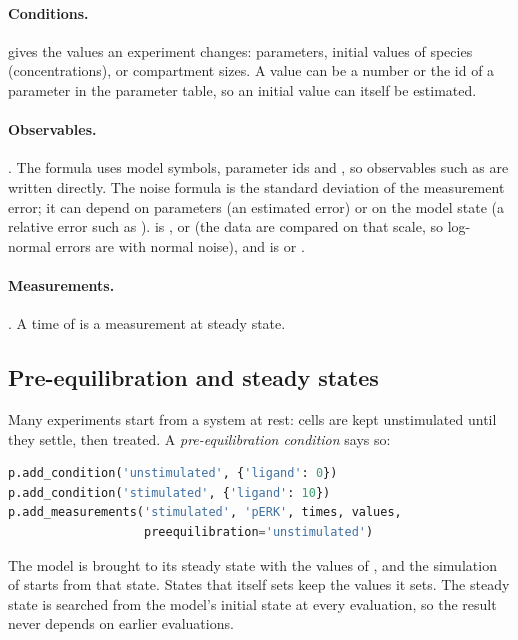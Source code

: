 \paragraph{Conditions.}  gives the values an experiment changes: parameters,
initial values of species (concentrations), or compartment sizes. A value can be a number or the id of a
parameter in the parameter table, so an initial value can itself be estimated.

\paragraph{Observables.} . The formula uses model symbols, parameter ids and , so observables such as
 are written directly. The noise formula is the standard deviation of the measurement
error; it can depend on parameters (an estimated error) or on the model state (a relative error such as
).  is ,  or  (the data are
compared on that scale, so log-normal errors are  with normal noise), and  is
 or .

\paragraph{Measurements.} . A time of
 is a measurement at steady state.

\subsection{Pre-equilibration and steady states}

Many experiments start from a system at rest: cells are kept unstimulated until they settle, then treated. A
\emph{pre-equilibration condition} says so:

\begin{lstlisting}[language=Python]
p.add_condition('unstimulated', {'ligand': 0})
p.add_condition('stimulated', {'ligand': 10})
p.add_measurements('stimulated', 'pERK', times, values,
                   preequilibration='unstimulated')
\end{lstlisting}

The model is brought to its steady state with the values of , and the simulation of
 starts from that state. States that  itself sets keep the values it sets.
The steady state is searched from the model's initial state at every evaluation, so the result never depends on
earlier evaluations.

